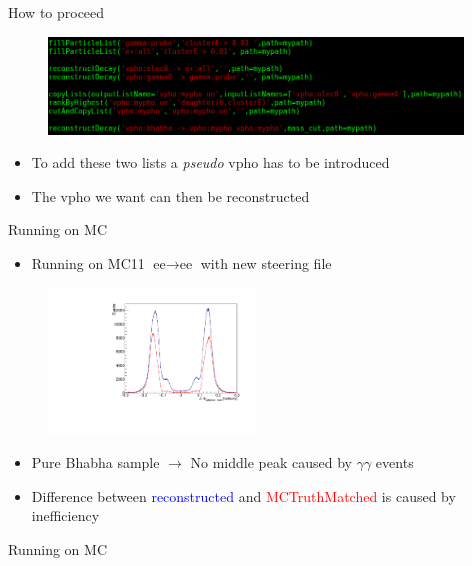 \documentclass[10pt]{beamer}
\begin{document}
{\begin{frame}{How to proceed}
\begin{itemize}
		 
	\end{itemize}

\begin{figure}
	\includegraphics[width=11cm]{Plots/newSc}
\end{figure}

\begin{itemize}
	\item To add these two lists a \textit{pseudo} vpho has to be introduced 
	\item The vpho we want can then be reconstructed
\end{itemize}




\end{frame}

\begin{frame}{Running on MC}
	\begin{itemize}
		\item Running on MC11 $\textrm{ee}\rightarrow \textrm{ee}$ with new steering file
	\end{itemize}
	\begin{figure}
		\includegraphics[width=5.5cm]{Plots/isSignalDeltaPhi}
	\end{figure}
\begin{itemize}
	\item Pure Bhabha sample $\rightarrow$ No middle peak caused by $\gamma \gamma$ events
	\item Difference between \textcolor{blue}{reconstructed} and \textcolor{red}{MCTruthMatched}  is caused by inefficiency
\end{itemize}

\end{frame}

\begin{frame}{Running on MC}
	

\end{frame}}
\end{document}
